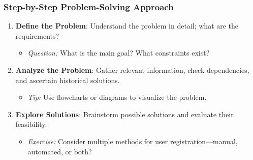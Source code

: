 \documentclass{beamer}
\begin{document}
\begin{frame}[fragile]
    \frametitle{Step-by-Step Problem-Solving Approach}
    \begin{enumerate}
        \item \textbf{Define the Problem}: Understand the problem in detail; what are the requirements?
            \begin{itemize}
                \item \textit{Question:} What is the main goal? What constraints exist?
            \end{itemize}

        \item \textbf{Analyze the Problem}: Gather relevant information, check dependencies, and ascertain historical solutions.
            \begin{itemize}
                \item \textit{Tip:} Use flowcharts or diagrams to visualize the problem.
            \end{itemize}
            
        \item \textbf{Explore Solutions}: Brainstorm possible solutions and evaluate their feasibility.
            \begin{itemize}
                \item \textit{Exercise:} Consider multiple methods for user registration—manual, automated, or both?
            \end{itemize}
    \end{enumerate}
\end{frame}
\end{document}
